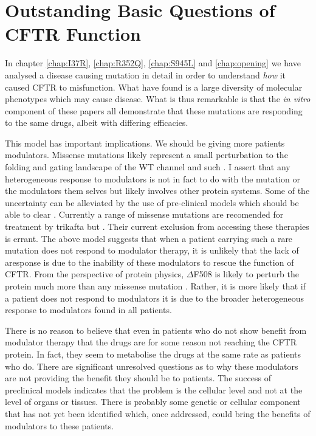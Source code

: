 \section{Outstanding Basic Questions of CFTR Function}
In chapter \ref{chap:I37R}, \ref{chap:R352Q}, \ref{chap:S945L} and \ref{chap:opening} we have analysed a disease causing mutation in detail in order to understand \textit{how} it caused CFTR to misfunction. What have found is a large diversity of molecular phenotypes which may cause disease. What is thus remarkable is that the \textit{in vitro} component of these papers all demonstrate that these mutations are responding to the same drugs, albeit with differing efficacies.


This model has important implications. We should be giving more patients modulators. Missense mutations likely represent a small perturbation to the folding and gating landscape of the WT channel and such . I assert that any heterogeneous response to modulators is not in fact to do with the mutation or the modulators them selves but likely involves other protein systems. Some of the uncertainty can be alleviated by the use of pre-clinical models which should be able to clear . Currently a range of missense mutations are recomended for treatment by trikafta but . Their current exclusion from accessing these therapies is errant. The above model suggests that when a patient carrying such a rare mutation does not respond to modulator therapy, it is unlikely that the lack of aresponse is due to the inability of these modulators to rescue the function of CFTR. From the perspective of protein physics, $\Delta$F508 is likely to perturb the protein much more than any missense mutation \cite{}. Rather, it is more likely that if a patient does not respond to modulators it is due to the broader heterogeneous response to modulators found in all patients. 


There is no reason to believe that even in patients who do not show benefit from modulator therapy that the drugs are for some reason not reaching the CFTR protein. In fact, they seem to metabolise the drugs at the same rate as patients who do. There are significant unresolved questions as to why these modulators are not providing the benefit they should be to patients. The success of preclinical models indicates that the problem is the cellular level and not at the level of organs or tissues. There is probably some genetic or cellular component that has not yet been identified which, once addressed, could bring the benefits of modulators to these patients.






